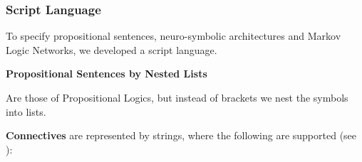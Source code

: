 \subsubsection{Script Language}\label{subsec:scriptLanguage} %

To specify propositional sentences, neuro-symbolic architectures and Markov Logic Networks, we developed a script language.

\textbf{Propositional Sentences by Nested Lists}

Are those of Propositional Logics, but instead of brackets we nest the symbols into lists.

\textbf{Connectives} are represented by strings, where the following are supported (see ):
\begin{center}
\end{center}

